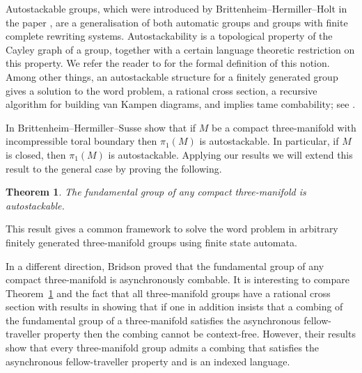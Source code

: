 \documentclass[12pt, a4paper]{amsart}
\newtheorem{theorem}{Theorem}[section]
\theoremstyle{definition}
\begin{document}
Autostackable groups, which were introduced by Brittenheim--Hermiller--Holt in the paper \cite{Brittenham2014}, are a generalisation of  
both automatic groups and groups with finite complete rewriting systems. Autostackability is a topological property of the Cayley graph of a group, together with a certain language theoretic restriction on this property. 
We refer the reader to \cite{Brittenham2014} for the formal definition of this notion. 
Among other things, an autostackable structure for a finitely generated group gives a solution to the word problem, 
a rational cross section, 
a recursive algorithm for building van Kampen diagrams, and implies tame combability; see 
\cite{Brittenham2014, brittenham2015uniform}.


In \cite[Theorem 6.2.]{Hermiller2018} Brittenheim--Hermiller--Susse show that if $M$ be a compact three-manifold with incompressible toral boundary then $\pi_1(M)$ is autostackable. In particular, if $M$ is closed, then $\pi_1(M)$ is autostackable. Applying our results we will extend this result to the general case by proving the following.


\begin{theorem}\label{thm:autostackable:intro} 
The fundamental group of any compact three-manifold is autostackable.
\end{theorem}

This result gives a common framework to solve the word problem in arbitrary finitely generated three-manifold groups using finite state automata.


In a different direction, Bridson proved \cite{bridson1993combings} that the fundamental group of any compact three-manifold is asynchronously combable. It is interesting to compare Theorem~\ref{thm:autostackable:intro} and the fact that all three-manifold groups have a rational cross section with results in \cite{BG1996} showing that if one in addition insists that a combing of the fundamental group of a three-manifold satisfies the asynchronous fellow-traveller property then the combing cannot be context-free. However, their results show that every three-manifold group admits a combing that satisfies the asynchronous fellow-traveller property and is an indexed language.
\end{document}
